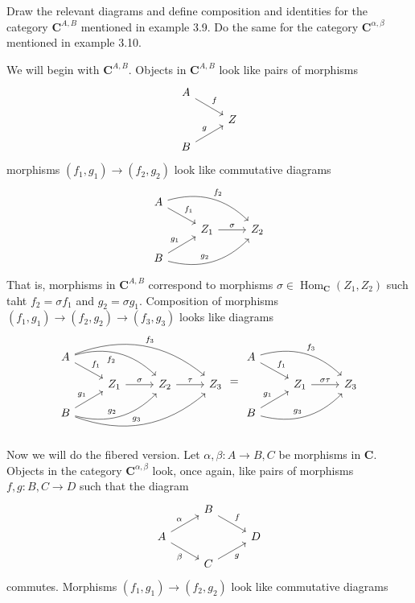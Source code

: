 \documentclass[11pt]{report}
\DeclareMathOperator{\Hom}{Hom}
\begin{document}
\begin{exercise}
	Draw the relevant diagrams and define composition and identities for the category $\mathbf{C}^{A,B}$ mentioned in example 3.9. Do the same for the category $\mathbf{C}^{\alpha ,\beta }$ mentioned in example 3.10.
\end{exercise}
\begin{solution}
	We will begin with $\mathbf{C}^{A,B}$. Objects in $\mathbf{C}^{A,B}$ look like pairs of morphisms
	\[\begin{tikzcd}[row sep=1em, column sep=2.5em]
		A\arrow[dr,"f"]\\
		&Z\\
		B\arrow[ur,"g"]
	\end{tikzcd}\]
	morphisms $(f_1,g_1)\to (f_2,g_2)$ look like commutative diagrams
	\[\begin{tikzcd}[row sep=1em, column sep=2.5em]
		A\arrow[dr,"f_1"]\arrow[drr,bend left,"f_2"]\\
		&Z_1\arrow[r,"\sigma "]&Z_2\\
		B\arrow[ur,"g_1"]\arrow[urr, bend right, "g_2"]
	\end{tikzcd}\]
	That is, morphisms in $\mathbf{C}^{A,B}$ correspond to morphisms $\sigma \in \Hom_{ \mathbf{C} }(Z_1 , Z_2) $ such taht $f_2=\sigma f_1$ and $g_2=\sigma g_1$. Composition of morphisms $(f_1,g_1)\to (f_2,g_2)\to (f_3,g_3)$ looks like diagrams
	\[\begin{tikzcd}[row sep=1em, column sep=2.5em]
		A\arrow[dr,"f_1"]\arrow[drr,bend left,"f_2"']\arrow[drrr,bend left, "f_3"]\\
		&Z_1\arrow[r,"\sigma "]&Z_2\arrow[r,"\tau "]&Z_3\\
		B\arrow[ur,"g_1"]\arrow[urr, bend right, "g_2"]\arrow[urrr,bend right, "g_3"]
	\end{tikzcd}=
\begin{tikzcd}[row sep=1em, column sep=2.5em]
		A\arrow[dr,"f_1"]\arrow[drr,bend left,"f_3"]\\
		&Z_1\arrow[r,"\sigma \tau  "]&Z_3\\
		B\arrow[ur,"g_1"]\arrow[urr, bend right, "g_3"]
	\end{tikzcd}\]

	Now we will do the fibered version. Let $\alpha ,\beta : A \to B,C$ be morphisms in $\mathbf{C}$. Objects in the category $\mathbf{C}^{\alpha ,\beta }$ look, once again, like pairs of morphisms $f,g : B,C \to D$ such that the diagram
	\[\begin{tikzcd}[row sep=1em, column sep=2.5em]
		&B\arrow[dr,"f"]\\
		A\arrow[ur,"\alpha "]\arrow[dr,"\beta"' ]&&D\\
		&C\arrow[ur,"g"']
	\end{tikzcd}\]
	commutes. Morphisms $(f_1,g_1)\to (f_2,g_2)$ look like commutative diagrams
\end{solution}
\end{document}
